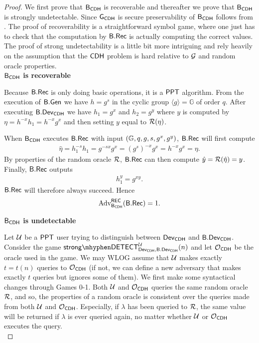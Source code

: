 \begin{proof}
We first prove that $\mathsf{B}_{\mathsf{CDH}}$ is recoverable and thereafter we prove that $\mathsf{B}_{\mathsf{CDH}}$ is strongly undetectable. Since $\operatorname{\mathsf{G}}_{\mathsf{CDH}}$ is secure preservability of $\mathsf{B}_{\mathsf{CDH}}$ follows from . The proof of recoverability is a straightforward symbol game, where one just has to check that the computation by $\mathsf{B}.\mathsf{Rec}$ is actually computing the correct values. The proof of strong undetectability is a little bit more intriguing and rely heavily on the assumption that the $\mathsf{CDH}$ problem is hard relative to $\operatorname{\mathcal{G}}$ and random oracle properties. \\

\noindent\textbf{$\mathsf{B}_{\mathsf{CDH}}$ is recoverable} 

Because $\mathsf{B}.\mathsf{Rec}$ is only doing basic operations, it is a $\mathsf{PPT}$ algorithm. From the execution of $\mathsf{B}.\mathsf{Gen}$ we have $h=g^s$ in the cyclic group $\langle g\rangle = \mathbb{G}$ of order $q$. After executing $\mathsf{B}.\mathsf{Dev}_{\mathsf{CDH}}$ we have $h_1=g^x$ and $h_2=g^y$ where $y$ is computed by $\eta=h^{-x}h_1=h^{-x}g^x$ and then setting $y$ equal to $\operatorname{\mathcal{R}}(\eta)$. 

When $\mathsf{B}_{\mathsf{CDH}}$ executes $\mathsf{B}.\mathsf{Rec}$ with input $(\mathbb{G},q,g,s,g^x,g^y)$, $\mathsf{B}.\mathsf{Rec}$ will first compute
\begin{align*}
	\hat{\eta} = h_1^{-s}h_1 = g^{-sx}g^x = (g^s)^{-x}g^x = h^{-x}g^x = \eta.
\end{align*}
By properties of the random oracle $\operatorname{\mathcal{R}}$, $\mathsf{B}.\mathsf{Rec}$ can then compute $\hat{y}=\operatorname{\mathcal{R}}(\hat{\eta}) = y$. Finally, $\mathsf{B}.\mathsf{Rec}$ outputs
\begin{align*}
	h_1^y = g^{xy}.
\end{align*}
$\mathsf{B}.\mathsf{Rec}$ will therefore always succeed. Hence 
\begin{align*}
	\operatorname{Adv}_{\mathsf{B}_{\mathsf{CDH}}}^{\mathsf{REC}}(\mathsf{B}.\mathsf{Rec}) = 1.
\end{align*} 

\noindent\textbf{$\mathsf{B}_{\mathsf{CDH}}$ is undetectable}

Let $\mathcal{U}$ be a $\mathsf{PPT}$ user trying to distinguish between $\operatorname{\mathsf{Dev}}_{\mathsf{CDH}}$ and $\mathsf{B}.\mathsf{Dev}_{\mathsf{CDH}}$. Consider the game $\strongdetect{\dev_{\CDH}}{\bbdev_{\CDH}}{\user}$ and let $\operatorname{\mathcal{O}}_{\mathsf{CDH}}$ be the oracle used in the game. We may WLOG assume that $\mathcal{U}$ makes exactly $t = t(n)$ queries to $\operatorname{\mathcal{O}}_{\mathsf{CDH}}$ (if not, we can define a new adversary that makes exactly $t$ queries but ignores some of them). We first make some syntactical changes through Games 0-1. Both $\mathcal{U}$ and $\operatorname{\mathcal{O}}_{\mathsf{CDH}}$ queries the same random oracle $\operatorname{\mathcal{R}}$, and so, the properties of a random oracle is consistent over the queries made from both $\mathcal{U}$ and $\operatorname{\mathcal{O}}_{\mathsf{CDH}}$. Especially, if $\lambda$ has been queried to $\operatorname{\mathcal{R}}$, the same value will be returned if $\lambda$ is ever queried again, no matter whether $\mathcal{U}$ or $\operatorname{\mathcal{O}}_{\mathsf{CDH}}$ executes the query. \\


\end{proof}

